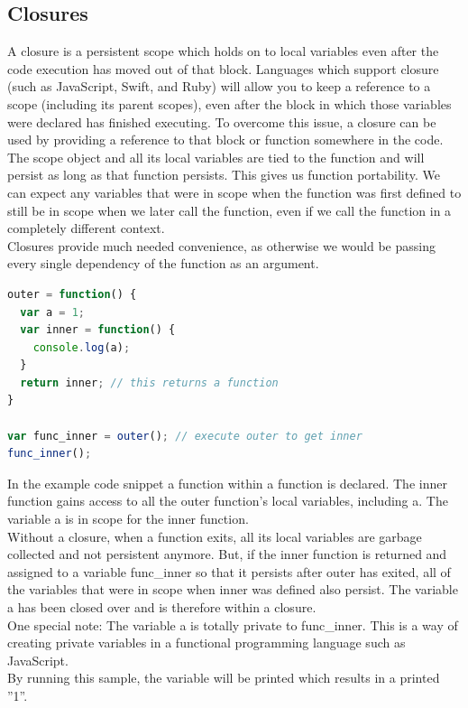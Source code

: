 \documentclass[12pt]{article}
\begin{document}
\subsection{Closures}

A closure is a persistent scope which holds on to local variables even after the code execution has moved out of that block. Languages which support closure (such as JavaScript, Swift, and Ruby) will allow you to keep a reference to a scope (including its parent scopes), even after the block in which those variables were declared has finished executing. To overcome this issue, a closure can be used by providing a reference to that block or function somewhere in the code.\\
The scope object and all its local variables are tied to the function and will persist as long as that function persists.
This gives us function portability. We can expect any variables that were in scope when the function was first defined to still be in scope when we later call the function, even if we call the function in a completely different context.\\
Closures provide much needed convenience, as otherwise we would be passing every single dependency of the function as an argument.

\begin{lstlisting}[language=javascript]
outer = function() {
  var a = 1;
  var inner = function() {
    console.log(a);
  }
  return inner; // this returns a function
}

var func_inner = outer(); // execute outer to get inner 
func_inner();
\end{lstlisting}

In the example code snippet a function within a function is declared. The inner function gains access to all the outer function's local variables, including a. The variable a is in scope for the inner function.\\
Without a closure, when a function exits, all its local variables are garbage collected and not persistent anymore. But, if the inner function is returned and assigned to a variable func\_inner so that it persists after outer has exited, all of the variables that were in scope when inner was defined also persist. The variable a has been closed over and is therefore within a closure.\\
One special note: The variable a is totally private to func\_inner. This is a way of creating private variables in a functional programming language such as JavaScript.\\
By running this sample, the variable will be printed which results in a printed ''1''.
\end{document}
